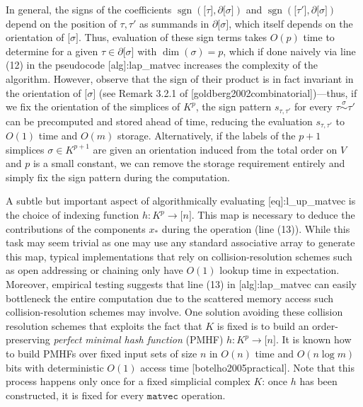 In general, the signs of the coefficients \(\operatorname{sgn}\left. \left( \left. \lbrack\tau\rbrack \right.,\partial\left. \lbrack\sigma\rbrack \right. \right) \right.\) and \(\operatorname{sgn}\left. \left( \left. \lbrack\tau'\rbrack \right.,\partial\left. \lbrack\sigma\rbrack \right. \right) \right.\) depend on the position of \(\tau,\tau'\) as summands in \(\partial\left. \lbrack\sigma\rbrack \right.\), which itself depends on the orientation of \(\left. \lbrack\sigma\rbrack \right.\). Thus, evaluation of these sign terms takes \(O(p)\) time to determine for a given \(\tau \in \partial\left. \lbrack\sigma\rbrack \right.\) with \(\dim(\sigma) = p\), which if done naively via line (12) in the pseudocode {[}alg{]}:lap\_matvec increases the complexity of the algorithm. However, observe that the sign of their product is in fact invariant in the orientation of \(\left. \lbrack\sigma\rbrack \right.\) (see Remark 3.2.1 of {[}goldberg2002combinatorial{]})---thus, if we fix the orientation of the simplices of \(K^{p}\), the sign pattern \(s_{\tau,\tau'}\) for every \(\tau\overset{\sigma}{\sim}\tau'\) can be precomputed and stored ahead of time, reducing the evaluation \(s_{\tau,\tau'}\) to \(O(1)\) time and \(O(m)\) storage. Alternatively, if the labels of the \(p + 1\) simplices \(\sigma \in K^{p + 1}\) are given an orientation induced from the total order on \(V\) and \(p\) is a small constant, we can remove the storage requirement entirely and simply fix the sign pattern during the computation.

A subtle but important aspect of algorithmically evaluating {[}eq{]}:l\_up\_matvec is the choice of indexing function \(h:K^{p} \rightarrow \left. \lbrack n\rbrack \right.\). This map is necessary to deduce the contributions of the components \(x_{\ast}\) during the operation (line (13)). While this task may seem trivial as one may use any standard associative array to generate this map, typical implementations that rely on collision-resolution schemes such as open addressing or chaining only have \(O(1)\) lookup time in expectation. Moreover, empirical testing suggests that line (13) in {[}alg{]}:lap\_matvec can easily bottleneck the entire computation due to the scattered memory access such collision-resolution schemes may involve. One solution avoiding these collision resolution schemes that exploits the fact that \(K\) is fixed is to build an order-preserving \emph{perfect minimal hash function} (PMHF) \(h:K^{p} \rightarrow \left. \lbrack n\rbrack \right.\). It is known how to build PMHFs over fixed input sets of size \(n\) in \(O(n)\) time and \(O\left( n\log m \right)\) bits with deterministic \(O(1)\) access time {[}botelho2005practical{]}. Note that this process happens only once for a fixed simplicial complex \(K\): once \(h\) has been constructed, it is fixed for every \(\mathtt{matvec}\) operation.

